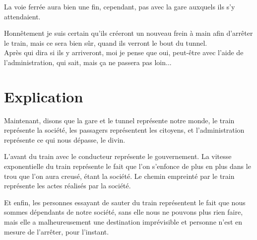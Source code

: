 \documentclass[]{liberty}
\begin{document}
La voie ferrée aura bien une fin, cependant, pas avec la gare auxquels ils s'y attendaient.\newline

Honnêtement je suis certain qu'ils créeront un nouveau frein à main afin d'arrêter le train, mais ce sera bien 
sûr, quand ils verront le bout du tunnel. \\
Après qui dira si ils y arriveront, moi je pense que oui, peut-être avec l'aide de l'administration, qui sait, mais 
ça ne passera pas loin...
\section*{Explication}
Maintenant, disons que la gare et le tunnel représente notre monde, le train représente la société, les 
passagers représentent les citoyens, et l'administration représente ce qui nous dépasse, le divin.

L'avant du train avec le conducteur représente le gouvernement. La vitesse exponentielle du train représente le fait 
que l'on s'enfonce de plus en plus dans le trou que l'on aura creusé, étant la société. Le chemin empreinté par le 
train représente les actes réalisés par la société.

Et enfin, les personnes essayant de sauter du train représentent le fait que nous sommes dépendants de notre société, 
sans elle nous ne pouvons plus rien faire, mais elle a malheureusement une destination imprévisible et personne n'est 
en mesure de l'arrêter, pour l'instant.
\end{document}
